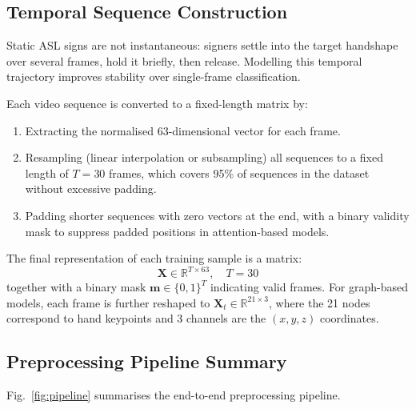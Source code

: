 \documentclass[conference]{IEEEtran}
\begin{document}
\subsection{Temporal Sequence Construction}

Static ASL signs are not instantaneous: signers settle into the target handshape
over several frames, hold it briefly, then release. Modelling this temporal
trajectory improves stability over single-frame classification.

Each video sequence is converted to a fixed-length matrix by:
\begin{enumerate}
  \item Extracting the normalised 63-dimensional vector for each frame.
  \item Resampling (linear interpolation or subsampling) all sequences to a
        fixed length of $T = 30$ frames, which covers 95\% of sequences in
        the dataset without excessive padding.
  \item Padding shorter sequences with zero vectors at the end, with a binary
        validity mask to suppress padded positions in attention-based models.
\end{enumerate}

The final representation of each training sample is a matrix:
\begin{equation}
  \mathbf{X} \in \mathbb{R}^{T \times 63}, \quad T = 30
\end{equation}
together with a binary mask $\mathbf{m} \in \{0,1\}^{T}$ indicating valid frames.
For graph-based models, each frame is further reshaped to
$\mathbf{X}_t \in \mathbb{R}^{21 \times 3}$, where the 21 nodes correspond to
hand keypoints and 3 channels are the $(x, y, z)$ coordinates.

\subsection{Preprocessing Pipeline Summary}

Fig.~\ref{fig:pipeline} summarises the end-to-end preprocessing pipeline.
\end{document}

